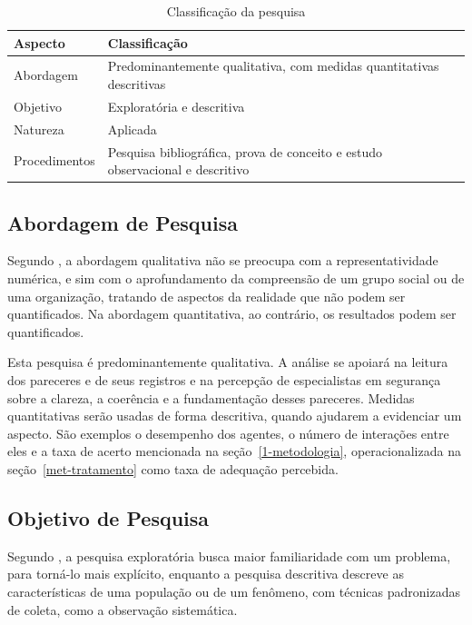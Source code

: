 \begin{table}[htbp]
\centering
\caption{Classificação da pesquisa}
\label{tab-classificacao}
\begingroup
\footnotesize
\SingleSpacing
\renewcommand{\arraystretch}{1.15}
\begin{tabularx}{0.85\textwidth}{>{\raggedright\arraybackslash}p{3.2cm}>{\raggedright\arraybackslash}X}
\hline
\textbf{Aspecto} & \textbf{Classificação} \\ \hline
Abordagem & Predominantemente qualitativa, com medidas quantitativas descritivas \\ \hline
Objetivo & Exploratória e descritiva \\ \hline
Natureza & Aplicada \\ \hline
Procedimentos & Pesquisa bibliográfica, prova de conceito e estudo observacional e descritivo \\ \hline
\end{tabularx}
\endgroup
{}
\end{table}

\subsection{Abordagem de Pesquisa}
\label{met-abordagem}

Segundo , a abordagem qualitativa não se preocupa com a representatividade numérica, e sim com o aprofundamento da compreensão de um grupo social ou de uma organização, tratando de aspectos da realidade que não podem ser quantificados. Na abordagem quantitativa, ao contrário, os resultados podem ser quantificados.

Esta pesquisa é predominantemente qualitativa. A análise se apoiará na leitura dos pareceres e de seus registros e na percepção de especialistas em segurança sobre a clareza, a coerência e a fundamentação desses pareceres. Medidas quantitativas serão usadas de forma descritiva, quando ajudarem a evidenciar um aspecto. São exemplos o desempenho dos agentes, o número de interações entre eles e a taxa de acerto mencionada na seção~\ref{1-metodologia}, operacionalizada na seção~\ref{met-tratamento} como taxa de adequação percebida.

\subsection{Objetivo de Pesquisa}
\label{met-objetivo}

Segundo , a pesquisa exploratória busca maior familiaridade com um problema, para torná-lo mais explícito, enquanto a pesquisa descritiva descreve as características de uma população ou de um fenômeno, com técnicas padronizadas de coleta, como a observação sistemática.

